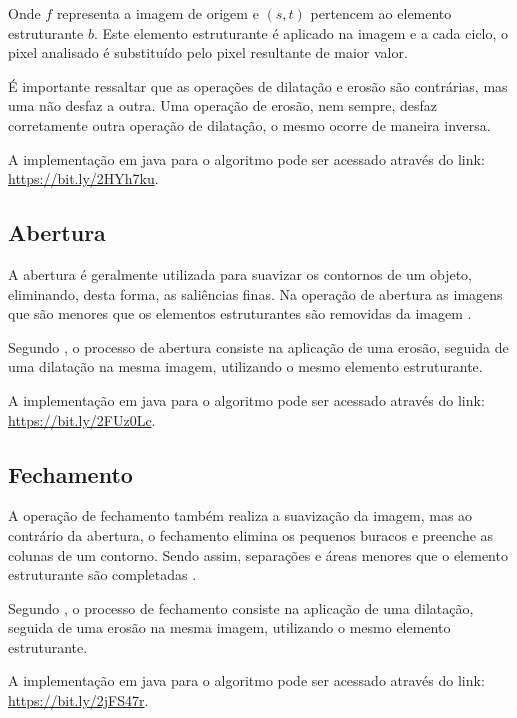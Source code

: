 \documentclass[
	12pt,				%
	oneside,			%
	a4paper,			%
	english,			%
	french,				%
	spanish,			%
	brazil,				%
	]{abntex2}
\begin{document}
Onde \(f\) representa a imagem de origem e \((s, t)\) pertencem ao elemento estruturante \(b\). Este elemento estruturante é aplicado na imagem e a cada ciclo, o pixel analisado é substituído pelo pixel resultante de maior valor.

É importante ressaltar que as operações de dilatação e erosão são contrárias, mas uma não desfaz a outra. Uma operação de erosão, nem sempre, desfaz corretamente outra operação de dilatação, o mesmo ocorre de maneira inversa.

A implementação em java para o algoritmo pode ser acessado através do link: \url{https://bit.ly/2HYh7ku}.

\subsection{Abertura}

A abertura é geralmente utilizada para suavizar os contornos de um objeto, eliminando, desta forma, as saliências finas. Na operação de abertura as imagens que são menores que os elementos estruturantes são removidas da imagem \cite{gonzalesWoods:2008}.

Segundo \citet{pedriniSchwartz:2008}, o processo de abertura consiste na aplicação de uma erosão, seguida de uma dilatação na mesma imagem, utilizando o mesmo elemento estruturante.

A implementação em java para o algoritmo pode ser acessado através do link: \url{https://bit.ly/2FUz0Lc}.

\subsection{Fechamento}

A operação de fechamento também realiza a suavização da imagem, mas ao contrário da abertura, o fechamento elimina os pequenos buracos e preenche as colunas de um contorno. Sendo assim, separações e áreas menores que o elemento estruturante são completadas \cite{gonzalesWoods:2008}.

Segundo \citet{pedriniSchwartz:2008}, o processo de fechamento consiste na aplicação de uma dilatação, seguida de uma erosão na mesma imagem, utilizando o mesmo elemento estruturante.

A implementação em java para o algoritmo pode ser acessado através do link: \url{https://bit.ly/2jFS47r}.
\end{document}

